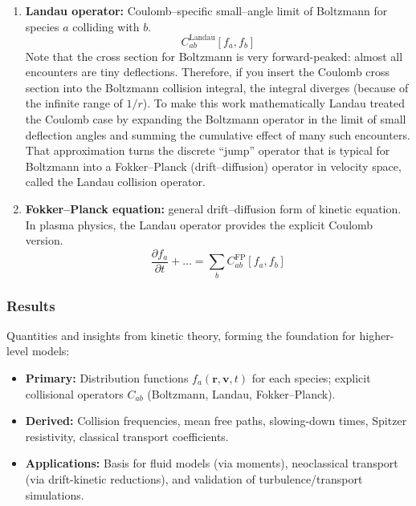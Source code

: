 \documentclass[10pt]{book}
\begin{document}
\begin{enumerate}
  \item \textbf{Landau operator:} Coulomb–specific small–angle limit of Boltzmann for species $a$ colliding with $b$. 
  \begin{equation}
    C_{ab}^{\text{Landau}}[f_a,f_b]
  \end{equation}
  Note that the cross section for Boltzmann is very forward-peaked: almost all encounters are tiny deflections.
  Therefore, if you insert the Coulomb cross section into the Boltzmann collision integral, the integral diverges (because of the infinite range of $1/r$).
  To make this work mathematically Landau treated the Coulomb case by expanding the Boltzmann operator in the limit of small deflection angles and summing the cumulative effect of many such encounters.
  That approximation turns the discrete “jump” operator that is typical for Boltzmann into a Fokker–Planck (drift–diffusion) operator in velocity space, called the Landau collision operator.


  \item \textbf{Fokker–Planck equation:} general drift–diffusion form of kinetic equation.
  In plasma physics, the Landau operator provides the explicit Coulomb version.
  \begin{equation}
    \frac{\partial f_a}{\partial t} + \dots = \sum_b C_{ab}^{\text{FP}}[f_a,f_b]
  \end{equation}
\end{enumerate}

\subsubsection{Results}
Quantities and insights from kinetic theory, forming the foundation for higher-level models:
\begin{itemize}
    \item \textbf{Primary:} Distribution functions $f_a(\mathbf{r},\mathbf{v},t)$ for each species; explicit collisional operators $C_{ab}$ (Boltzmann, Landau, Fokker--Planck).
    \item \textbf{Derived:} Collision frequencies, mean free paths, slowing-down times, Spitzer resistivity, classical transport coefficients.
    \item \textbf{Applications:} Basis for fluid models (via moments), neoclassical transport (via drift-kinetic reductions), and validation of turbulence/transport simulations.
\end{itemize}
\end{document}
